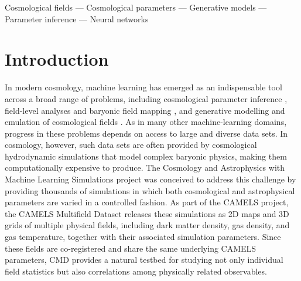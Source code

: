 \documentclass[usenatbib]{mnras}
\begin{document}
\begin{keywords}
Cosmological fields ---
Cosmological parameters ---
Generative models ---
Parameter inference ---
Neural networks
\end{keywords}



\section{Introduction}
\label{sec:intro}
In modern cosmology, machine learning has emerged as an indispensable
tool across a broad range of problems,
including cosmological parameter inference
\citep{Ravanbakhsh2017,Cranmer2020}, field-level analyses and baryonic
field mapping \citep{JoKim2019,Zhang2019}, and generative modelling
and emulation of cosmological fields
\citep{Mustafa2019,He2019,Perraudin2021}.
As in many other machine-learning domains, progress in these problems
depends on access to large and diverse data sets. In cosmology, however,
such data sets are often provided by cosmological hydrodynamic
simulations that model complex baryonic physics, making them
computationally expensive to produce.
The Cosmology and Astrophysics with Machine Learning Simulations
\citep[CAMELS;][]{Villaescusa2021} project was conceived to address
this challenge by providing thousands of simulations in which both
cosmological and astrophysical parameters are varied in a controlled
fashion. As part of the CAMELS project, the CAMELS Multifield Dataset \citep[CMD;][]{Villaescusa2022}
releases these simulations as 2D maps and 3D grids of multiple
physical fields, including dark matter density, gas density, and gas temperature, 
together with their associated simulation parameters.
Since these fields are co-registered and share the same underlying
CAMELS parameters, CMD provides a natural testbed for studying not
only individual field statistics but also correlations among
physically related observables.
\end{document}
